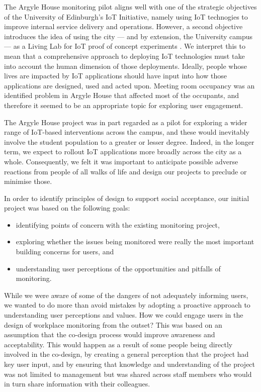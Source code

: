 The Argyle House monitoring pilot aligns well with one of the strategic objectives of the University of Edinburgh's IoT Initiative, namely using IoT technogies to improve internal service delivery and operations. However, a second objective introduces the idea of using the city --- and by extension, the University campus --- as a Living Lab for IoT proof of concept experiments \cite{IoT-Strategy}. We interpret this to mean that a comprehensive approach to deploying IoT technologies must take into account the human dimension of those deployments. Ideally, people whose lives are impacted by IoT applications should have input into how those applications are designed, used and acted upon. Meeting room occupancy was an identified problem in Argyle House that affected most of the occupants, and therefore it seemed to be an appropriate topic for exploring user engagement.

The Argyle House project was in part regarded as a pilot for exploring a wider range of IoT-based interventions across the campus, and these would inevitably involve the student population to a greater or lesser degree. Indeed, in the longer term, we expect to rollout IoT applications more broadly across the city as a whole. Consequently, we felt it was important to anticipate possible adverse reactions from people of all walks of life and design our projects to preclude or minimise those. 

In order to identify principles of design to support social acceptance, our initial project was based on the following goals:
\begin{itemize}
\item identifying points of concern with the existing monitoring project,
\item exploring whether the issues being monitored were really the most important building concerns for users, and
\item understanding user perceptions of the opportunities and pitfalls of monitoring.
\end{itemize}

While we were aware of some of the dangers of not adequately informing users, we wanted to do more than avoid mistakes by adopting a proactive approach to understanding user perceptions and values. How we could engage users in the design of workplace monitoring from the outset? This was based on an assumption that the co-design process would improve awareness and acceptability. This would happen as a result of some people being directly involved in the co-design, by creating a general perception that the project had key user input, and by ensuring that knowledge and understanding of the project was not limited to management but was shared across staff members who would in turn share information with their colleagues.

